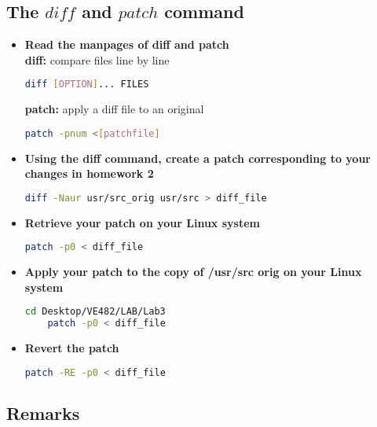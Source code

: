 \documentclass{article}
\begin{document}
\begin{spacing}{2}
\subsection{The $diff$ and $patch$ command}
\begin{itemize}
	\item \textbf{Read the manpages of diff and patch}\\
	\textbf{diff:} compare files line by line\\
	\begin{lstlisting}[language=bash]
	diff [OPTION]... FILES
	\end{lstlisting}
	\textbf{patch:} apply a diff file to an original\\
	\begin{lstlisting}[language=bash]
	patch -pnum <[patchfile]
	\end{lstlisting}
	\item \textbf{Using the diff command, create a patch corresponding to your changes in homework 2}\\
	\begin{lstlisting}[language=bash]
	diff -Naur usr/src_orig usr/src > diff_file
	\end{lstlisting}
	\item \textbf{Retrieve your patch on your Linux system}\\
	\begin{lstlisting}[language=bash]
	patch -p0 < diff_file
	\end{lstlisting}
	\item \textbf{Apply your patch to the copy of /usr/src orig on your Linux system}\\
	\begin{lstlisting}[language=bash]
	cd Desktop/VE482/LAB/Lab3
	patch -p0 < diff_file
	\end{lstlisting}
	\item \textbf{Revert the patch}\\
	\begin{lstlisting}[language=bash]
	patch -RE -p0 < diff_file
	\end{lstlisting}
\end{itemize}
\subsection{Remarks}
\end{spacing}
\end{document}
